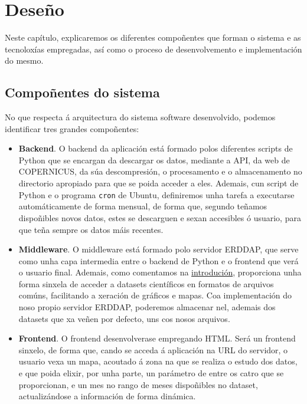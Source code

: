 \chapter{Deseño}

Neste capítulo, explicaremos  os diferentes compoñentes que forman o sistema e as tecnoloxías empregadas, así como o proceso de desenvolvemento e implementación do mesmo.

\section{Compoñentes do sistema}\label{componentes}
No que respecta á arquitectura do sistema software desenvolvido, podemos identificar tres grandes compoñentes:
\begin{itemize}
    \item \textbf{Backend}. O backend da aplicación está formado polos diferentes scripts de Python que se encargan da descargar os datos, mediante a API, da web de COPERNICUS, da súa
    descompresión, o procesamento e o almacenamento no directorio apropiado para que se poida acceder a eles. Ademais, cun script de Python e o programa  \texttt{cron} de Ubuntu,
    definiremos unha tarefa a executarse automáticamente de forma mensual, de forma que, segundo teñamos dispoñibles novos datos, estes se descarguen e sexan accesibles ó usuario, para que
    teña sempre os datos máis recentes.
    \item \textbf{Middleware}. O middleware está formado polo servidor ERDDAP, que serve como unha capa intermedia entre o backend de Python e o frontend que verá o usuario final.
    Ademais, como comentamos na \hyperref[descricion]{introdución}, proporciona unha forma sinxela de acceder a datasets científicos en formatos de arquivos comúns, facilitando a
    xeración de gráficos e mapas. Coa implementación do noso propio servidor ERDDAP, poderemos almacenar nel, ademais dos datasets que xa veñen por defecto, uns cos nosos arquivos.
    \item \textbf{Frontend}. O frontend desenvolverase empregando HTML. Será un frontend sinxelo, de forma que, cando se acceda á aplicación na URL do servidor, o usuario
    vexa un mapa, acoutado á zona na que se realiza o estudo dos datos, e que poida elixir, por unha parte, un parámetro de entre os catro que se proporcionan, e un mes no rango de
    meses dispoñibles no dataset, actualizándose a información de forma dinámica.
\end{itemize}


